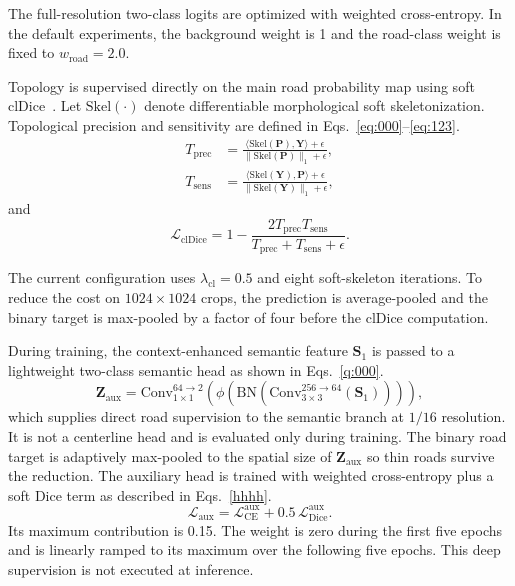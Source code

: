 \documentclass[a4paper,fleqn, review]{cas-sc}
\begin{document}
The full-resolution two-class logits are optimized with weighted
cross-entropy.  In the default experiments, the background weight is 1 and the road-class weight is fixed to \(w_{\mathrm{road}}=2.0\).

Topology is supervised directly on the main road probability map using soft
clDice~\cite{shit2021cldice}. Let $\mathrm{Skel}(\cdot)$ denote
differentiable morphological soft skeletonization. Topological precision and
sensitivity are defined in Eqs.~\eqref{eq:000}--\eqref{eq:123}.
%
\begin{align}
	\label{eq:000}
	T_{\mathrm{prec}} &=
	\frac{\langle \mathrm{Skel}(\mathbf{P}),\mathbf{Y}\rangle+\epsilon}
	{\|\mathrm{Skel}(\mathbf{P})\|_1+\epsilon},\\
	\label{eq:001}
	T_{\mathrm{sens}} &=
	\frac{\langle \mathrm{Skel}(\mathbf{Y}),\mathbf{P}\rangle+\epsilon}
	{\|\mathrm{Skel}(\mathbf{Y})\|_1+\epsilon},
\end{align}
%
and
%
\begin{equation}
	\label{eq:123}
	\mathcal{L}_{\mathrm{clDice}}=
	1-
	\frac{2T_{\mathrm{prec}}T_{\mathrm{sens}}}
	{T_{\mathrm{prec}}+T_{\mathrm{sens}}+\epsilon}.
\end{equation}

%
The current configuration uses $\lambda_{\mathrm{cl}}=0.5$ and eight
soft-skeleton iterations. To reduce the cost on $1024\times1024$ crops, the
prediction is average-pooled and the binary target is max-pooled by a factor
of four before the clDice computation.

During training, the context-enhanced semantic feature $\mathbf{S}_1$ is passed to a lightweight two-class semantic
head as shown in Eqs.~\eqref{q:000}.
%
\begin{equation}
\label{q:000}
\mathbf{Z}_{\mathrm{aux}}=
\mathrm{Conv}_{1\times1}^{64\rightarrow2}
\left(
\phi\!\left(
\mathrm{BN}\!\left(
\mathrm{Conv}_{3\times3}^{256\rightarrow64}
(\mathbf{S}_1)
\right)\right)\right),
\end{equation}
%
which supplies direct road supervision to the semantic branch at $1/16$ resolution.
It is not a centerline head and is evaluated only during training. The binary
road target is adaptively max-pooled to the spatial size of
$\mathbf{Z}_{\mathrm{aux}}$ so thin roads survive the reduction. The auxiliary
head is trained with weighted cross-entropy plus a soft Dice term as described in Eqs.~\eqref{hhhh}.
%
\begin{equation}
\label{hhhh}
\mathcal{L}_{\mathrm{aux}}=
\mathcal{L}_{\mathrm{CE}}^{\mathrm{aux}}+
0.5\,\mathcal{L}_{\mathrm{Dice}}^{\mathrm{aux}}.
\end{equation}
%
Its maximum contribution is 0.15. The weight is zero during the first five
epochs and is linearly ramped to its maximum over the following five epochs.
This deep supervision is not executed at inference.
\end{document}
